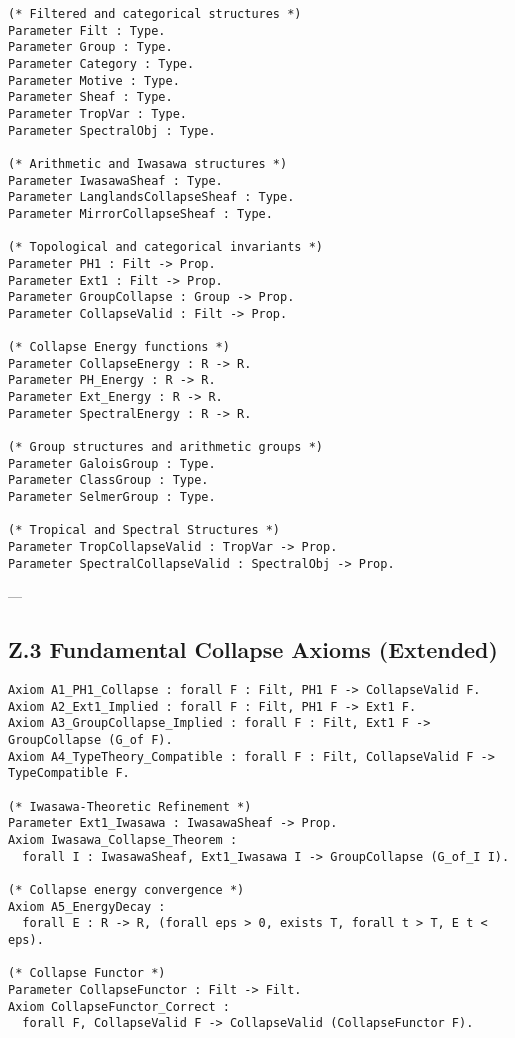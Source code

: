 \documentclass[11pt]{article}
\begin{document}
\begin{lstlisting}[language=Coq]
(* Filtered and categorical structures *)
Parameter Filt : Type.
Parameter Group : Type.
Parameter Category : Type.
Parameter Motive : Type.
Parameter Sheaf : Type.
Parameter TropVar : Type.
Parameter SpectralObj : Type.

(* Arithmetic and Iwasawa structures *)
Parameter IwasawaSheaf : Type.
Parameter LanglandsCollapseSheaf : Type.
Parameter MirrorCollapseSheaf : Type.

(* Topological and categorical invariants *)
Parameter PH1 : Filt -> Prop.
Parameter Ext1 : Filt -> Prop.
Parameter GroupCollapse : Group -> Prop.
Parameter CollapseValid : Filt -> Prop.

(* Collapse Energy functions *)
Parameter CollapseEnergy : R -> R.
Parameter PH_Energy : R -> R.
Parameter Ext_Energy : R -> R.
Parameter SpectralEnergy : R -> R.

(* Group structures and arithmetic groups *)
Parameter GaloisGroup : Type.
Parameter ClassGroup : Type.
Parameter SelmerGroup : Type.

(* Tropical and Spectral Structures *)
Parameter TropCollapseValid : TropVar -> Prop.
Parameter SpectralCollapseValid : SpectralObj -> Prop.
\end{lstlisting}

---

\subsection*{Z.3 Fundamental Collapse Axioms (Extended)}

\begin{lstlisting}[language=Coq]
Axiom A1_PH1_Collapse : forall F : Filt, PH1 F -> CollapseValid F.
Axiom A2_Ext1_Implied : forall F : Filt, PH1 F -> Ext1 F.
Axiom A3_GroupCollapse_Implied : forall F : Filt, Ext1 F -> GroupCollapse (G_of F).
Axiom A4_TypeTheory_Compatible : forall F : Filt, CollapseValid F -> TypeCompatible F.

(* Iwasawa-Theoretic Refinement *)
Parameter Ext1_Iwasawa : IwasawaSheaf -> Prop.
Axiom Iwasawa_Collapse_Theorem :
  forall I : IwasawaSheaf, Ext1_Iwasawa I -> GroupCollapse (G_of_I I).

(* Collapse energy convergence *)
Axiom A5_EnergyDecay :
  forall E : R -> R, (forall eps > 0, exists T, forall t > T, E t < eps).

(* Collapse Functor *)
Parameter CollapseFunctor : Filt -> Filt.
Axiom CollapseFunctor_Correct :
  forall F, CollapseValid F -> CollapseValid (CollapseFunctor F).
\end{lstlisting}
\end{document}
